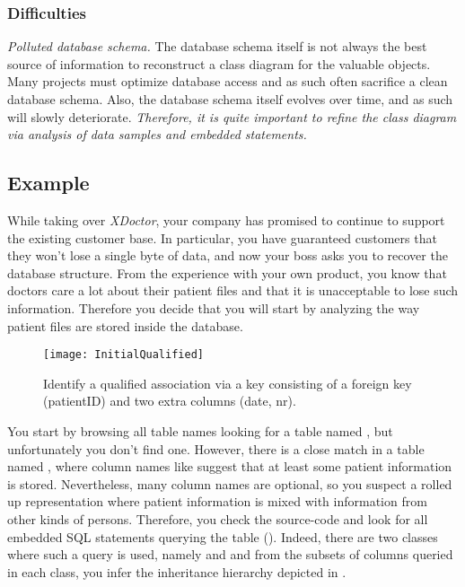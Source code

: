 \documentclass[a4paper,10pt,twoside]{book}
\begin{document}
\subsubsection*{Difficulties}

\begin{bulletlist}
\item \emph{Polluted database schema.}
The database schema itself is not always the best source of information to reconstruct a 
class diagram for the valuable objects. Many projects must optimize database access and as 
such often sacrifice a clean database schema. Also, the database schema itself evolves over 
time, and as such will slowly deteriorate. \emph{Therefore, it is quite important to refine 
the class diagram via analysis of data samples and embedded  statements.}
\end{bulletlist}

\subsection*{Example}

While taking over \emph{XDoctor}, your company has promised to continue to support the 
existing customer base. In particular, you have guaranteed customers that they won't lose a 
single byte of data, and now your boss asks you to recover the database structure. From the 
experience with your own product, you know that doctors care a lot about their patient 
files and that it is unacceptable to lose such information. Therefore you decide that you 
will start by analyzing the way patient files are stored inside the database.

\begin{figure}
\begin{center}
\texttt{[image: InitialQualified]}
\caption{Identify a qualified association via a key consisting of a foreign key (patientID) 
and two extra columns (date, nr).}
\end{center}
\end{figure}

You start by browsing all table names looking for a table named , but 
unfortunately you don't find one. However, there is a close match in a table named 
, where column names like  suggest that at least some patient 
information is stored. Nevertheless, many column names are optional, so you suspect a 
rolled up representation where patient information is mixed with information from other 
kinds of persons. Therefore, you check the source-code and look for all embedded SQL 
statements querying the table  (\ie {}). Indeed, 
there are two classes where such a query is used, namely  and  
and from the subsets of columns queried in each class, you infer the inheritance hierarchy 
depicted in .
\end{document}
